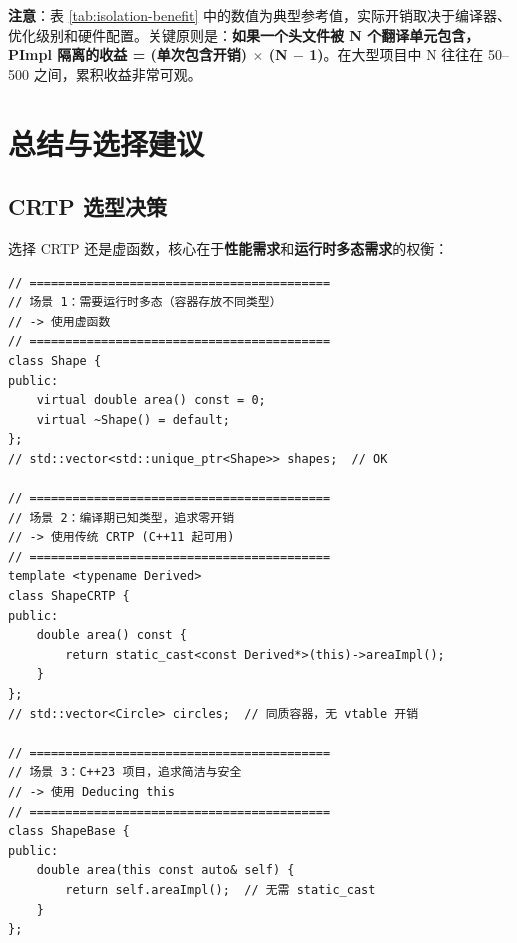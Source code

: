 \documentclass[12pt,a4paper,fontset=fandol]{ctexbook}
\begin{document}
\noindent\textbf{注意}：表 \ref{tab:isolation-benefit} 中的数值为典型参考值，实际开销取决于编译器、优化级别和硬件配置。关键原则是：\textbf{如果一个头文件被 N 个翻译单元包含，PImpl 隔离的收益 = (单次包含开销) $\times$ (N $-$ 1)}。在大型项目中 N 往往在 50--500 之间，累积收益非常可观。

\section{总结与选择建议}

\subsection{CRTP 选型决策}

选择 CRTP 还是虚函数，核心在于\textbf{性能需求}和\textbf{运行时多态需求}的权衡：

\begin{lstlisting}[caption={决策参考：CRTP vs 虚函数 vs Deducing this}]
// ==========================================
// 场景 1：需要运行时多态（容器存放不同类型）
// -> 使用虚函数
// ==========================================
class Shape {
public:
    virtual double area() const = 0;
    virtual ~Shape() = default;
};
// std::vector<std::unique_ptr<Shape>> shapes;  // OK

// ==========================================
// 场景 2：编译期已知类型，追求零开销
// -> 使用传统 CRTP (C++11 起可用)
// ==========================================
template <typename Derived>
class ShapeCRTP {
public:
    double area() const {
        return static_cast<const Derived*>(this)->areaImpl();
    }
};
// std::vector<Circle> circles;  // 同质容器，无 vtable 开销

// ==========================================
// 场景 3：C++23 项目，追求简洁与安全
// -> 使用 Deducing this
// ==========================================
class ShapeBase {
public:
    double area(this const auto& self) {
        return self.areaImpl();  // 无需 static_cast
    }
};
\end{lstlisting}
\end{document}
